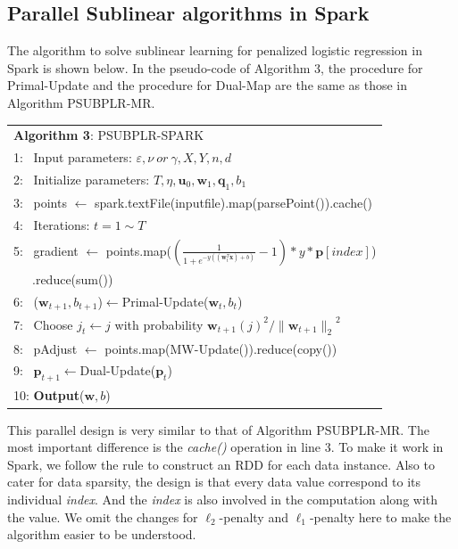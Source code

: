 \documentclass[10pt, conference, compsocconf]{IEEEtran}
\newcommand{\bw}{\mathbf{w}}
\newcommand{\bp}{\mathbf{p}}
\newcommand{\bq}{\mathbf{q}}
\newcommand{\lc}{\left(}
\newcommand{\rc}{\right)}
\newcommand{\lj}{\lc j\rc}
\newcommand{\tspace}{\hspace*{2em}}
\begin{document}
\subsection{Parallel Sublinear algorithms in Spark}
The algorithm to solve sublinear learning for penalized logistic regression in Spark is shown below.
In the pseudo-code of Algorithm 3, the procedure for Primal-Update and the procedure for Dual-Map are the same as those in Algorithm PSUBPLR-MR.
    \begin{table}[ht]
	\begin{tabular}{l}
    \hline\noalign{\smallskip}
	\textbf{Algorithm 3}: PSUBPLR-SPARK \\
	\noalign{\smallskip}
	\hline
	\noalign{\smallskip}
    1:  ~Input parameters: $\varepsilon, \nu~or~\gamma, X, Y, n, d$ \\
    2:	~Initialize parameters: $T, \eta, {\mathbf{u}}_{0}, {\bw}_{1}, {\mathbf{\bq}}_{1}, {b}_{1}$\\
    3:  ~points $\leftarrow$ spark.textFile(inputfile).map(parsePoint()).cache() \\
    4:  ~Iterations: $t=1 \sim T$ \\
    5:  ~\tspace gradient $\leftarrow$ points.map($(\frac{1}{1+e^{-y((\bw_t^T \textbf{x})+b)}}-1) * y * \bp [index]$) \\
        ~~~\tspace\tspace\tspace\tspace\tspace .reduce(sum()) \\
    6:  ~\tspace ($\bw_{t+1}, b_{t+1}$)$\leftarrow$Primal-Update($\bw_t, b_t$) \\
    7:  ~\tspace Choose $j_t \leftarrow j$ with probability ${{\bw}_{t+1}\lj}^{2}/{\|{\bw}_{t+1}\|_2}^{2} $ \\
    8:  ~\tspace pAdjust $\leftarrow$ points.map(MW-Update()).reduce(copy()) \\
    9:  ~\tspace $\bp_{t+1}\leftarrow$Dual-Update($\bp_t$)  \\
    10: \textbf{Output}($\bw, b$) \\
    \hline
    \end{tabular}
	\end{table}

This parallel design is very similar to that of Algorithm PSUBPLR-MR.
The most important difference is the \textit{cache()} operation in line 3.
To make it work in Spark, we follow the rule to construct an RDD for each data instance.
Also to cater for data sparsity, the design is that every data value correspond to its individual \textit{index}. And the \textit{index} is also involved in the computation along with the value.
We omit the changes for $\ell_2$-penalty and $\ell_1$-penalty here to make the algorithm easier to be understood.
\end{document}
